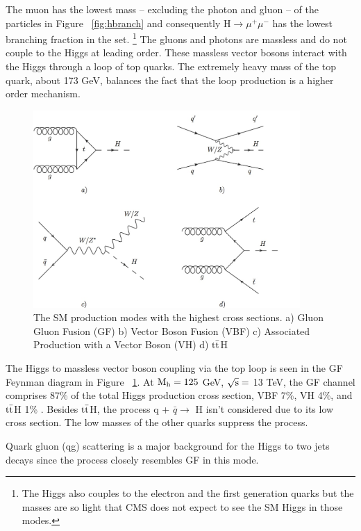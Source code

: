 The muon has the lowest mass -- excluding the photon and gluon -- of the particles in Figure ~\ref{fig:hbranch} and consequently H$\rightarrow \mu^{+}\mu^{-}$ has the lowest branching fraction in the set. \footnote{The Higgs also couples to the electron and the first generation quarks but the masses are so light that CMS does not expect to see the SM Higgs in those modes.} The gluons and photons are massless and do not couple to the Higgs at leading order. These massless vector bosons interact with the Higgs through a loop of top quarks. The extremely heavy mass of the top quark, about 173 GeV, balances the fact that the loop production is a higher order mechanism.  
\begin{figure}[h!]
  \centering
  \includegraphics[width=4in]{images/higgs_production_modes.png}
  \caption
   {The SM production modes with the highest cross sections. a) Gluon Gluon Fusion (GF) b) Vector Boson Fusion (VBF) c) Associated Production with a Vector Boson (VH) d) ${\rm t\bar{t}}$H}
  \label{fig:hfeynprod}
\end{figure}

The Higgs to massless vector boson coupling via the top loop is seen in the GF Feynman diagram in Figure ~\ref{fig:hfeynprod}. At ${\rm M_{h} = 125}$ GeV, ${\rm \sqrt{s} =}$ 13 TeV, the GF channel comprises 87\% of the total Higgs production cross section, VBF 7\%, VH 4\%, and ${\rm t\bar{t}}$H 1\% \cite{crossbranchplots}. Besides ${\rm t\bar{t}}$H, the process q + $\bar{q} \rightarrow$ H isn't considered due to its low cross section. The low masses of the other quarks suppress the process. 

Quark gluon (qg) scattering is a major background for the Higgs to two jets decays since the process closely resembles GF in this mode.   

